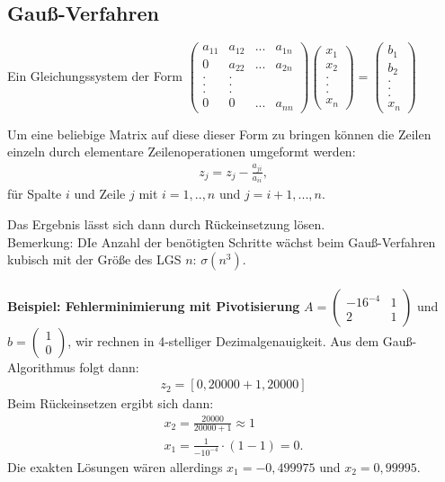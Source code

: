 \documentclass{scrartcl}
\begin{document}
\subsection{Gauß-Verfahren}
Ein Gleichungssystem der Form $\begin{pmatrix}
a_{11} & a_{12} & ... & a_{1n} \\
0 & a_{22} & ... & a_{2n} \\
. & .\\
. & .\\
. & .\\
0 & 0 & ... & a_{nn}
\end{pmatrix}	\begin{pmatrix}
x_1 \\ x_2 \\. \\ . \\ . \\x_n  
\end{pmatrix}=\begin{pmatrix}
b_1 \\ b_2 \\. \\. \\. \ \\x_n  
\end{pmatrix}$

Um eine beliebige Matrix auf diese dieser Form zu bringen können die Zeilen einzeln durch elementare Zeilenoperationen umgeformt werden:
\begin{align*}
z_j=z_j-\frac{a_{ji}}{a_{ii}},
\end{align*}
für Spalte $i$ und Zeile $j$ mit $i=1,..,n$ und $j=i+1,...,n$.

Das Ergebnis lässt sich dann durch Rückeinsetzung lösen.\\
Bemerkung: DIe Anzahl der benötigten Schritte wächst beim Gauß-Verfahren kubisch mit der Größe des LGS $n$: $\sigma(n^3)$.\\
\\
\textbf{Beispiel: Fehlerminimierung mit Pivotisierung}
$A= \begin{pmatrix}
-16^{-4} & 1 \\
2 & 1 
\end{pmatrix}$ und $b=\begin{pmatrix}
1 \\ 0
\end{pmatrix}$, wir rechnen in 4-stelliger Dezimalgenauigkeit.
Aus dem Gauß-Algorithmus folgt dann:
\begin{align*}
z_2=[0,20000+1,20000]
\end{align*}
Beim Rückeinsetzen ergibt sich dann:
\begin{align*}
x_2=\frac{20000}{20000+1} \approx 1 \\
x_1=\frac{1}{-10^{-4}} \cdot (1-1) =0.
\end{align*}
Die exakten Lösungen wären allerdings $x_1=-0,499975$ und $x_2=0,99995$.
\end{document}
